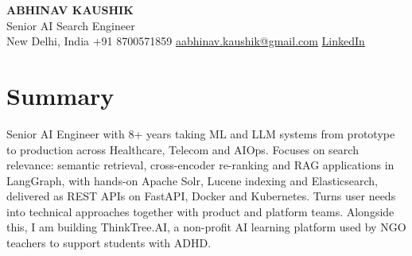\documentclass[10pt,a4paper]{article}
\begin{document}
\begin{center}
  {\LARGE\bfseries ABHINAV KAUSHIK}\\[2pt]
  {\large Senior AI Search Engineer}\\[2pt]
  New Delhi, India \textbar{} +91 8700571859 \textbar{} \href{mailto:aabhinav.kaushik@gmail.com}{aabhinav.kaushik@gmail.com} \textbar{} \href{https://www.linkedin.com/in/abhinav-kaushik10/}{LinkedIn}  
\end{center}

\section{Summary}
Senior AI Engineer with 8+ years taking ML and LLM systems from prototype to production across Healthcare, Telecom and AIOps. Focuses on search relevance: semantic retrieval, cross-encoder re-ranking and RAG applications in LangGraph, with hands-on Apache Solr, Lucene indexing and Elasticsearch, delivered as REST APIs on FastAPI, Docker and Kubernetes. Turns user needs into technical approaches together with product and platform teams. Alongside this, I am building ThinkTree.AI, a non-profit AI learning platform used by NGO teachers to support students with ADHD.
\end{document}
